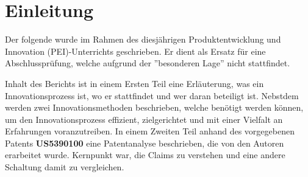 \clearpage
\section{Einleitung}\label{sec:Einleitung}
Der folgende wurde im Rahmen des diesjährigen Produktentwicklung und Innovation (PEI)-Unterrichts geschrieben. Er dient als Ersatz für eine Abschlussprüfung, welche aufgrund der ''besonderen Lage'' nicht stattfindet. 

Inhalt des Berichts ist in einem Ersten Teil eine Erläuterung, was ein Innovationsprozess ist, wo er stattfindet und wer daran beteiligt ist. Nebstdem werden zwei Innovationsmethoden beschrieben, welche benötigt werden können, um den Innovationsprozess effizient, zielgerichtet und mit einer Vielfalt an Erfahrungen voranzutreiben.
In einem Zweiten Teil anhand des vorgegebenen Patents \textbf{US5390100} eine Patentanalyse beschrieben, die von den Autoren erarbeitet wurde. Kernpunkt war, die Claims zu verstehen und eine andere Schaltung damit zu vergleichen.
\newpage







